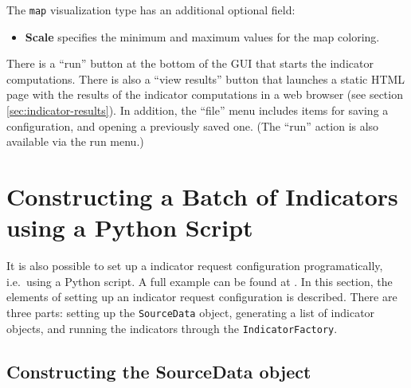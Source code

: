 The \verb|map| visualization type has an additional optional field: 
\begin{itemize}
\item {\bf Scale} specifies the minimum and maximum values for the map coloring. 
\end{itemize}  

There is a ``run'' button at the bottom of the GUI that starts the indicator 
computations.  There is also a ``view results'' button that launches a 
static HTML page with the results of the indicator computations in a 
web browser (see section \ref{sec:indicator-results}). In
addition, the ``file'' menu includes items for saving a configuration, and
opening a previously saved one.  (The ``run'' action is also available via
the run menu.) 

\section{Constructing a Batch of Indicators using a Python Script}
\label{sec:indicator-configuration-script}

It is also possible to set up a indicator request configuration
programatically, i.e.\ using a Python script. A full example can be found at 
. In this 
section, the elements of setting up an indicator request configuration 
is described. There are three parts: setting up the \verb|SourceData| 
object, generating a list of indicator objects, and running the 
indicators through the \verb|IndicatorFactory|.

\subsection{Constructing the SourceData object}

